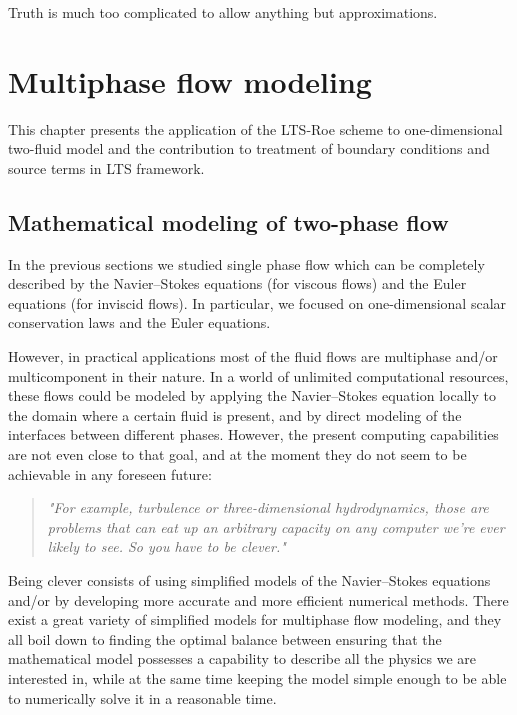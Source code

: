 
\begin{savequote}[50mm]
Truth is much too complicated to allow anything but approximations.
\end{savequote}

\chapter{Multiphase flow modeling}
\label{cha:MPM}


This chapter presents the application of the LTS-Roe scheme to one-dimensional two-fluid model and the contribution to treatment of boundary conditions and source terms in LTS framework.

\section{Mathematical modeling of two-phase flow}

In the previous sections we studied single phase flow which can be completely described by the Navier--Stokes equations (for viscous flows) and the Euler equations (for inviscid flows). In particular, we focused on one-dimensional scalar conservation laws and the Euler equations.

However, in practical applications most of the fluid flows are multiphase and/or multicomponent in their nature. In a world of unlimited computational resources, these flows could be modeled by applying the Navier--Stokes equation locally to the domain where a certain fluid is present, and by direct modeling of the interfaces between different phases. However, the present computing capabilities are not even close to that goal, and at the moment they do not seem to be achievable in any foreseen future:

\noindent\begin{minipage}{\linewidth}
\begin{quote}
\small
\textit{"For example, turbulence or three-dimensional hydrodynamics, those are problems that can eat up an arbitrary capacity on any computer we're ever likely to see. So you have to be clever."}
\end{quote}
\end{minipage}

Being clever consists of using simplified models of the Navier--Stokes equations and/or by developing more accurate and more efficient numerical methods. There exist a great variety of simplified models for multiphase flow modeling, and they all boil down to finding the optimal balance between ensuring that the mathematical model possesses a capability to describe all the physics we are interested in, while at the same time keeping the model simple enough to be able to numerically solve it in a reasonable time. 


